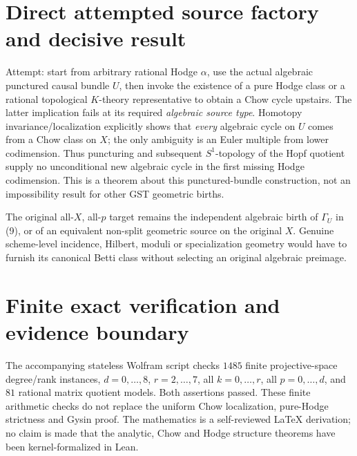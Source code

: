 \documentclass[11pt]{article}
\begin{document}
\section{Direct attempted source factory and decisive result}
Attempt: start from arbitrary rational Hodge $\alpha$, use the
actual algebraic punctured causal bundle $U$, then invoke
the existence of a pure Hodge class or a rational topological
$K$-theory representative to obtain a Chow cycle upstairs.
The latter implication fails at its required \emph{algebraic
source type}. Homotopy invariance/localization explicitly
shows that \emph{every} algebraic cycle on $U$ comes from a
Chow class on $X$; the only ambiguity is an Euler multiple
from lower codimension. Thus puncturing and subsequent
$S^1$-topology of the Hopf quotient supply no unconditional
new algebraic cycle in the first missing Hodge codimension.
This is a theorem about this punctured-bundle construction,
not an impossibility result for other GST geometric births.

The original all-$X$, all-$p$ target remains the independent
algebraic birth of $\Gamma_U$ in (9), or of an equivalent
non-split geometric source on the original $X$. Genuine
scheme-level incidence, Hilbert, moduli or specialization
geometry would have to furnish its canonical Betti class
without selecting an original algebraic preimage.

\section{Finite exact verification and evidence boundary}
The accompanying stateless Wolfram script checks $1485$
finite projective-space degree/rank instances, $d=0,\ldots,8$,
$r=2,\ldots,7$, all $k=0,\ldots,r$, all $p=0,\ldots,d$,
and $81$ rational matrix quotient models. Both assertions
passed. These finite arithmetic checks do not replace the
uniform Chow localization, pure-Hodge strictness and Gysin proof.
The mathematics is a self-reviewed LaTeX derivation; no claim
is made that the analytic, Chow and Hodge structure theorems
have been kernel-formalized in Lean.
\end{document}
